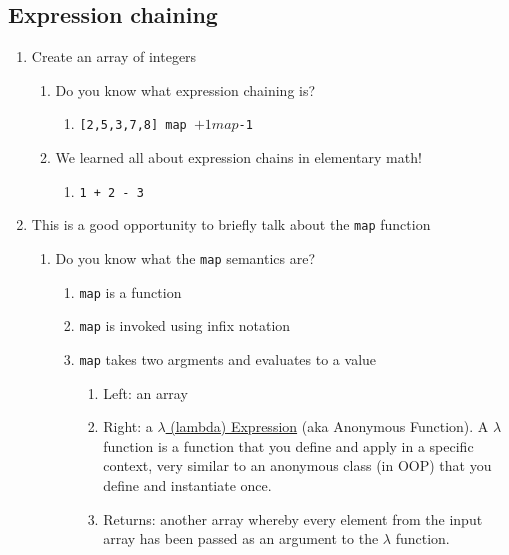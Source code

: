 \subsection{Expression chaining}
\begin{enumerate}[resume*]
\item Create an array of integers
  \begin{enumerate}
  \item Do you know what expression chaining is?
    \begin{enumerate}
    \item \texttt{[2,5,3,7,8] map $+1 map $-1}
    \end{enumerate}
  \item We learned all about expression chains in elementary math!
    \begin{enumerate}
    \item \texttt{1 + 2 - 3}
    \end{enumerate}
  \end{enumerate}
\item This is a good opportunity to briefly talk about the \texttt{map} function
  \begin{enumerate}
  \item Do you know what the \texttt{map} semantics are?
    \begin{enumerate}
    \item \texttt{map} is a function
    \item \texttt{map} is invoked using infix notation
    \item \texttt{map} takes two argments and evaluates to a value
      \begin{enumerate}
      \item Left: an array
      \item Right: a \href{https://en.wikipedia.org/wiki/Lambda\_calculus}{$\lambda$ (lambda) Expression} (aka Anonymous Function). A $\lambda$ function is a function that you define and apply in a specific context, very similar to an anonymous class (in OOP) that you define and instantiate once.
      \item Returns: another array whereby every element from the input array has been passed as an argument to the $\lambda$ function.
      \end{enumerate}
    \end{enumerate}
  \end{enumerate}
\end{enumerate}

